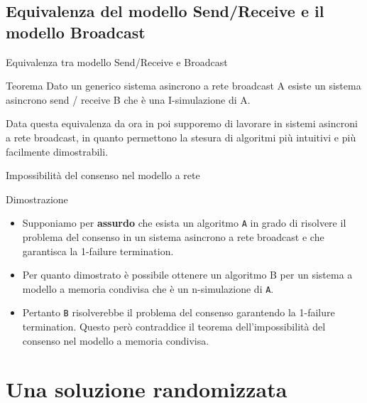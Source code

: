 \documentclass{beamer}
\begin{document}

\subsection{Equivalenza del modello Send/Receive e il modello Broadcast}

\begin{frame}{Equivalenza tra modello Send/Receive e Broadcast}
    \begin{block}{Teorema}
        Dato un generico sistema asincrono a rete broadcast A esiste un sistema asincrono send / receive B che è una I-simulazione di A.
    \end{block}

    \vspace{0.5cm}

    Data questa equivalenza da ora in poi supporemo di lavorare in sistemi asincroni a rete broadcast, in quanto permettono la stesura di algoritmi più intuitivi e più facilmente dimostrabili.
\end{frame}


\begin{frame}{Impossibilità del consenso nel modello a rete}
    \begin{block}{Dimostrazione}
    \begin{itemize}
        \item Supponiamo per \textbf{assurdo} che esista un algoritmo \texttt{A} in grado di risolvere il problema del consenso in un sistema asincrono a rete broadcast e che garantisca la 1-failure termination.
        \item Per quanto dimostrato è possibile ottenere un algoritmo B per un sistema a modello a memoria condivisa che è un n-simulazione di \texttt{A}.
        \item Pertanto \texttt{B} risolverebbe il problema del consenso garantendo la 1-failure termination. Questo però contraddice il teorema dell'impossibilità del consenso nel modello a memoria condivisa.
    \end{itemize}
    \end{block}
\end{frame}


\section{Una soluzione randomizzata}
\end{document}
